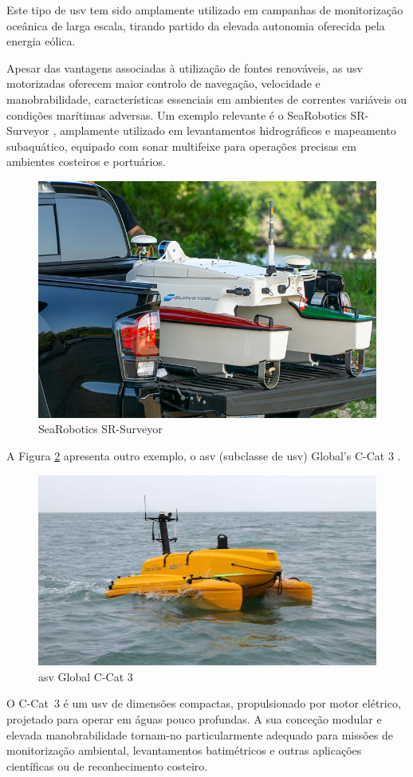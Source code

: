 Este tipo de \gls{usv} tem sido amplamente utilizado em campanhas de monitorização oceânica de larga escala, tirando partido da elevada autonomia oferecida pela energia eólica.  

Apesar das vantagens associadas à utilização de fontes renováveis, as \gls{usv} motorizadas oferecem maior controlo de navegação, velocidade e manobrabilidade, características essenciais em ambientes de correntes variáveis ou condições marítimas adversas. Um exemplo relevante é o SeaRobotics SR-Surveyor \cite{sr-surveyor-class}, amplamente utilizado em levantamentos hidrográficos e mapeamento subaquático, equipado com sonar multifeixe para operações precisas em ambientes costeiros e portuários.  

\begin{figure}[H]
    \centering
    \includegraphics[width=0.5\linewidth]{figuras/sr-surveyorm18-truck-bed.jpg}
    \caption[SeaRobotics SR-Surveyor]{SeaRobotics SR-Surveyor \cite{sr-surveyor-class}}
    \label{fig:sr-surveyor-carrinha}
\end{figure}

A Figura \ref{fig:c-cat-3-asv} apresenta outro exemplo, o \gls{asv} (subclasse de \gls{usv}) Global's C-Cat 3 \cite{c-cat-3-asv}.

\begin{figure}[H]
    \centering
    \includegraphics[width=0.5\linewidth]{figuras/c-cat3.jpeg}
    \caption[\gls{asv} Global C-Cat 3]{\gls{asv} Global C-Cat 3 \cite{c-cat-3-asv}}
    \label{fig:c-cat-3-asv}
\end{figure}

O C-Cat~3 \cite{c-cat-3-asv} é um \gls{usv} de dimensões compactas, propulsionado por motor elétrico, projetado para operar em águas pouco profundas. A sua conceção modular e elevada manobrabilidade tornam-no particularmente adequado para missões de monitorização ambiental, levantamentos batimétricos e outras aplicações científicas ou de reconhecimento costeiro.

